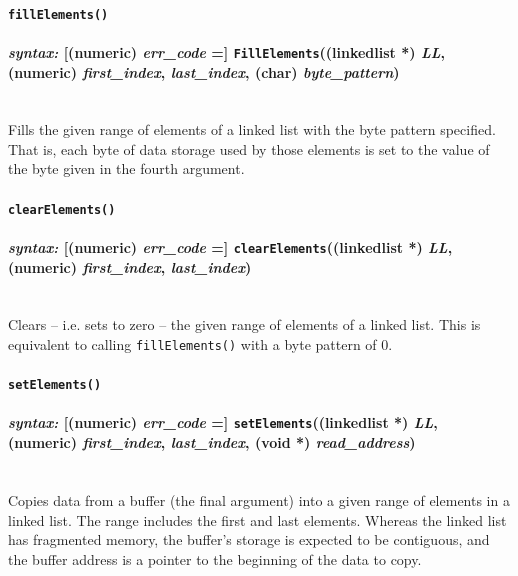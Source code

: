 \documentclass{article}
\begin{document}
\paragraph{\texttt{fillElements()}\\\\
\normalfont \emph{syntax: } [(numeric) \emph{err\_code} =] \texttt{FillElements}((linkedlist *) \emph{LL}, (numeric) \emph{first\_index}, \emph{last\_index}, (char) \emph{byte\_pattern})\\\\}

Fills the given range of elements of a linked list with the byte pattern specified.  That is, each byte of data storage used by those elements is set to the value of the byte given in the fourth argument.\\




\paragraph{\texttt{clearElements()}\\\\
\normalfont \emph{syntax: } [(numeric) \emph{err\_code} =] \texttt{clearElements}((linkedlist *) \emph{LL}, (numeric) \emph{first\_index}, \emph{last\_index})\\\\}

Clears -- i.e. sets to zero -- the given range of elements of a linked list.  This is equivalent to calling \texttt{fillElements()} with a byte pattern of 0.\\




\paragraph{\texttt{setElements()}\\\\
\normalfont \emph{syntax: } [(numeric) \emph{err\_code} =] \texttt{setElements}((linkedlist *) \emph{LL}, (numeric) \emph{first\_index}, \emph{last\_index}, (void *) \emph{read\_address})\\\\}

Copies data from a buffer (the final argument) into a given range of elements in a linked list.  The range includes the first and last elements.  Whereas the linked list has fragmented memory, the buffer's storage is expected to be contiguous, and the buffer address is a pointer to the beginning of the data to copy.\\
\end{document}
